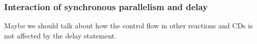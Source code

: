 \subsubsection{Interaction of synchronous parallelism and delay}
\label{sec:inter-synchr-parall}

{\color{red}Maybe we should talk about how the control flow in other
  reactions and CDs is not affected by the delay statement.}



